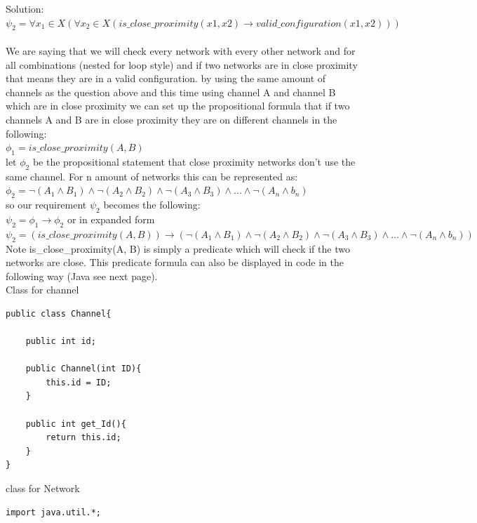 \documentclass{article}
\begin{document}
\begin{enumerate}[(a)]
\begin{enumerate}[(i)]
            Solution: \\
            $\psi_2 = \forall x_1 \in X(\forall x_2 \in X(is\_close\_proximity(x1, x2) \to valid\_configuration(x1, x2)))$\\\\
            We are saying that we will check every network with every other network and for all combinations (nested for loop style) and if two networks are in close proximity that means they are in a valid configuration. by using the same amount of channels as the question above and this time using channel A and channel B which are in close proximity we can set up the propositional formula that if two channels A and B are in close proximity they are on different channels in the following:\\
            $\phi_1 = is\_close\_proximity(A, B)$\\
            let $\phi_2$ be the propositional statement that close proximity networks don't use the same channel. For n amount of networks this can be represented as:\\
            $\phi_2 = \neg(A_1 \land B_1) \land \neg(A_2 \land B_2) \land \neg(A_3 \land B_3) \land ... \land \neg(A_n \land b_n)$\\
            so our requirement $\psi_2$ becomes the following:\\
            $\psi_2 = \phi_1 \to \phi_2$ or in expanded form\\
            $\psi_2 = (is\_close\_proximity(A,B)) \to (\neg(A_1 \land B_1) \land \neg(A_2 \land B_2) \land \neg(A_3 \land B_3) \land ... \land \neg(A_n \land b_n))$\\
            Note is\_close\_proximity(A, B) is simply a predicate which will check if the two networks are close. This predicate formula can also be displayed in code in the following way (Java see next page).\\
            
            \newpage
            Class for channel
            \begin{lstlisting}
public class Channel{

    public int id;
    
    public Channel(int ID){
        this.id = ID;
    }
    
    public int get_Id(){
        return this.id;
    }
}
            \end{lstlisting}
            
            class for Network
            \begin{lstlisting}
import java.util.*;


\end{lstlisting}
\end{enumerate}
\end{enumerate}
\end{document}
